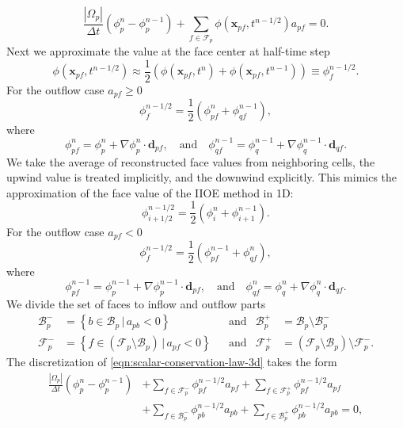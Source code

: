\documentclass[../thesis.tex]{subfiles}
\begin{document}
\begin{equation}
	\frac{|\Omega_p|}{\Delta t}(\phi_p^n - \phi_p^{n-1})
	+ \sum_{f \in \mathcal{F}_p} \phi(\boldsymbol{x}_{pf},t^{n-1/2}) a_{pf} = 0.
\end{equation}
Next we approximate the value at the face center at half-time step
\[
	\phi(\boldsymbol{x}_{pf},t^{n-1/2})
	\approx
	\frac{1}{2}(\phi(\boldsymbol{x}_{pf},t^n) + \phi(\boldsymbol{x}_{pf},t^{n-1}))
	\equiv
	\phi_{f}^{n-1/2}.
\]
For the outflow case $ a_{pf} \geq 0 $
\[
	\phi_{f}^{n-1/2} = \frac{1}{2}(\phi_{pf}^n + \phi_{qf}^{n-1}),
\]
where
\[
	\phi_{pf}^{n} = \phi_p^{n} + \nabla\phi_p^{n}\cdot\boldsymbol{d}_{pf},
	\quad \text{and} \quad
	\phi_{qf}^{n-1} = \phi_q^{n-1} + \nabla\phi_q^{n-1}\cdot\boldsymbol{d}_{qf}.
\]
We take the average of reconstructed face values from neighboring cells,
the upwind value is treated implicitly, and the downwind explicitly.
This mimics the approximation of the face value of the IIOE method in 1D:
\[
	\phi_{i+1/2}^{n-1/2} = \frac{1}{2}(\phi_i^{n} + \phi_{i+1}^{n-1}).
\]
For the outflow case $ a_{pf} < 0 $
\[
	\phi_{f}^{n-1/2} = \frac{1}{2}(\phi_{pf}^{n-1} + \phi_{qf}^{n}),
\]
where
\begin{equation}
	\phi_{pf}^{n-1} = \phi_p^{n-1} + \nabla\phi_p^{n-1}\cdot\boldsymbol{d}_{pf},
	\quad \text{and} \quad
	\phi_{qf}^{n} = \phi_q^{n} + \nabla\phi_q^{n}\cdot\boldsymbol{d}_{qf}.
\end{equation}
We divide the set of faces to inflow and outflow parts
\begin{align*}
	\mathcal{B}_p^- &= \left\{b \in \mathcal{B}_p\, |\, a_{pb} < 0\right\}
	& &\text{and} &
	\mathcal{B}_p^+ &= \mathcal{B}_p \setminus \mathcal{B}_p^- \\
	\mathcal{F}_p^- &= \left\{f \in (\mathcal{F}_p \setminus \mathcal{B}_p) \, |\, a_{pf} < 0\right\}
	& &\text{and} &
	\mathcal{F}_p^+ &= (\mathcal{F}_p \setminus \mathcal{B}_p) \setminus \mathcal{F}_p^-.
\end{align*}
The discretization of \eqref{eqn:scalar-conservation-law-3d} takes the form
\begin{equation}\label{eqn:fvm-discretization-3d}
	\begin{split}
	\frac{|\Omega_p|}{\Delta t}(\phi_p^{n} - \phi_p^{n-1})
	&+ \sum_{f \in \mathcal{F}_p^-} \phi_{pf}^{n-1/2} a_{pf}
	+ \sum_{f \in \mathcal{F}_p^+} \phi_{pf}^{n-1/2} a_{pf}\\
	&+ \sum_{f \in \mathcal{B}_p^-} \phi_{pb}^{n-1/2} a_{pb}
	+ \sum_{f \in \mathcal{B}_p^+} \phi_{pb}^{n-1/2} a_{pb} = 0,
	\end{split}
\end{equation}
\end{document}

